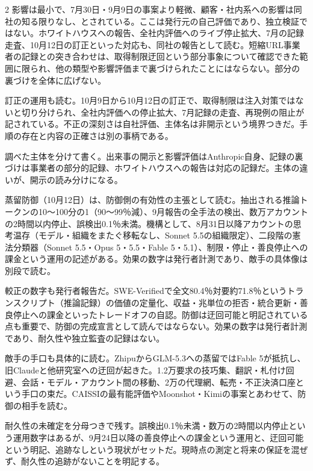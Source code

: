 \documentclass[lualatex,a4paper,10pt]{jlreq}
\begin{document}
\begin{multicols}{2}
影響は最小で、7月30日・9月9日の事案より軽微、顧客・社内系への影響は同社の知る限りなし、とされている。ここは発行元の自己評価であり、独立検証ではない。ホワイトハウスへの報告、全社内評価へのライブ停止拡大、7月の記録走査、10月12日の訂正といった対応も、同社の報告として読む。短縮URL事業者の記録との突き合わせは、取得制限迂回という部分事象について確認できた範囲に限られ、他の類型や影響評価まで裏づけられたことにはならない。部分の裏づけを全体に広げない。
\cite{B40,B79}


訂正の運用も読む。10月9日から10月12日の訂正で、取得制限は注入対策ではないと切り分けられ、全社内評価への停止拡大、7月記録の走査、再現例の阻止が記されている。不正の深刻さは自社評価、主体名は非開示という境界つきだ。手順の存在と内容の正確さは別の事柄である。
\cite{B40,B79}


調べた主体を分けて書く。出来事の開示と影響評価はAnthropic自身、記録の裏づけは事業者の部分的記録、ホワイトハウスへの報告は対応の記録だ。主体の違いが、開示の読み分けになる。
\cite{B40,B79}


蒸留防御（10月12日）は、防御側の有効性の主張として読む。抽出される推論トークンの10〜100分の1（90〜99％減）、9月報告の全手法の検出、数万アカウントの2時間以内停止、誤検出0.1％未満。機構として、8月31日以降アカウントの思考温存（モデル・組織をまたぐ移転なし、Sonnet 5.5の組織限定）、二段階の憲法分類器（Sonnet 5.5・Opus 5・5.5・Fable 5・5.1）、制限・停止・善良停止への課金という運用の記述がある。効果の数字は発行者計測であり、敵手の具体像は別段で読む。
\cite{B41,B80}


較正の数字も発行者報告だ。SWE-Verifiedで全文80.4％対要約71.8％というトランスクリプト（推論記録）の価値の定量化、収益・兆単位の拒否・統合更新・善良停止への課金といったトレードオフの自認。防御は迂回可能と明記されている点も重要で、防御の完成宣言として読んではならない。効果の数字は発行者計測であり、耐久性や独立監査の記録はない。
\cite{B41,B80}


敵手の手口も具体的に読む。ZhipuからGLM-5.3への蒸留ではFable 5が抵抗し、旧Claudeと他研究室への迂回が起きた。1.2万要求の技巧集、翻訳・札付け回避、会話・モデル・アカウント間の移動、2万の代理網、転売・不正決済口座という手口の束だ。CAISSIの最有能評価やMoonshot・Kimiの事案とあわせて、防御の相手を読む。
\cite{B41,B80}


耐久性の未確定を分母つきで残す。誤検出0.1％未満・数万の2時間以内停止という運用数字はあるが、9月24日以降の善良停止への課金という運用と、迂回可能という明記、追跡なしという現状がセットだ。現時点の測定と将来の保証を混ぜず、耐久性の追跡がないことを明記する。
\cite{B41,B80}



\end{multicols}
\end{document}
